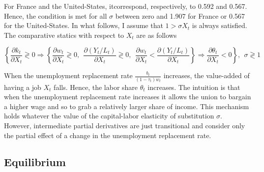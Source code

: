 \documentclass[
]{article}
\begin{document}
For France and the United-States, itcorrespond, respectively, to 0.592 and 0.567. Hence, the condition is met for all \(\sigma\) between zero and 1.907 for France or 0.567 for the United-States. In what follows, I assume that \(1>\sigma X_t\) is always satisfied. The comparative statics with respect to \(X_t\) are as follows

\begin{equation*}
    \left\lbrace \frac{\partial k_t}{\partial X_t} \gtrless 0 \Rightarrow 
    \left\lbrace \frac{\partial w_t}{\partial X_t} \gtrless 0,~~
    \frac{\partial (Y_t/L_t)}{\partial X_t} \gtrless 0,~~ \frac{\partial w_t}{\partial X_t} <
    \frac{\partial (Y_t/L_t)}{\partial X_t} \right\rbrace \Rightarrow 
    \frac{\partial \theta_t}{\partial X_t} < 0
    \right\rbrace, ~~ \sigma \gtrless 1
\end{equation*}

When the unemployment replacement rate \(\frac{b_t}{(1-\tau_t)w_t}\) increases, the value-added of having a job \(X_t\) falls. Hence, the labor share \(\theta_t\) increases. The intuition is that when the unemployment replacement rate increases it allows the union to bargain a higher wage and so to grab a relatively larger share of income. This mechanism holds whatever the value of the capital-labor elasticity of substitution \(\sigma\).
However, intermediate partial derivatives are just transitional and consider only the partial effect of a change in the unemployment replacement rate.

\hypertarget{equilibrium}{%
\subsection{Equilibrium}\label{equilibrium}}
\end{document}
